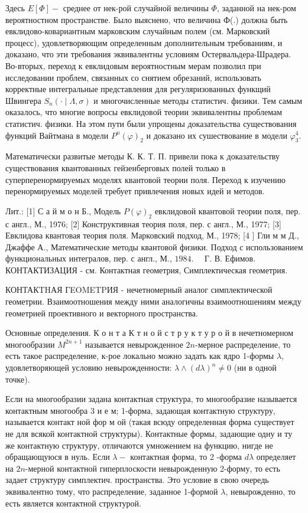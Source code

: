 \documentclass[10pt]{article}
\begin{document}
Здесь $E[\Phi]-$ среднее от нек-рой случайной величины $\Phi$, заданной на нек-ром вероятностном пространстве. Было выяснено, что величина Ф(.) должна быть евклидово-ковариантным марковским случайным полем (см. Марковский процесс), удовлетворяющим определенным дополнительным требованиям, и доказано, что эти требования эквивалентны условиям Остервальдера-Шрадера. Во-вторых, переход к евклидовым вероятностным мерам позволил при исследовании проблем, связанных со снятием обрезаний, использовать корректные интегральные представления для регуляризованных функщий Швингера $S_{n}(\cdot \mid \Lambda, \sigma)$ и многочисленные методы статистич. физики. Тем самым оказалось, что многие вопросы евклидовой теории эквивалентны проблемам статистич. физики. На этом пути были упрощены доказательства существования функций Вайтмана в модели $P^{n}(\varphi)_{2}$ и доказано их сушествование в модели $\varphi_{3}^{4}$.



Математически развитые методы К. К. Т. П. привели пока к доказательству существования квантованных гейзенберговых полей только в суперперенормируемых моделях квантовой теории поля. Переход к изучению перенормируемых моделей требует привлечения новых идей и методов.



Лит.: [1] С а й м о н Б., Модель $P(\varphi)_{2}$ евклидовой квантовой теории поля, пер. с англ., М., 1976; [2] Конструктивная теория поля, пер. с англ., М., 1977; [3] Евклидова квантовая теория поля. Марковский подход, М., 1978; [4 ] Гли м м Д., Джаффе А., Математические методы квантовой физики. Подход с использованием функциональных интегралов, пер. с англ., М., $1984 . \quad$ Г. В. Ефимов. КОНТАКТИЗАЦИЯ - см. Контактная геометрия, Симплектическая геометрия.



КОНТАКTHАЯ ГEOMETPИЯ - нечетномерный аналог симплектической геометрии. Взаимоотношения между ними аналогичны взаимоотношениям между геометрией проективного и векторного пространства.



Основные определения. К о н т а К т н о й с т р у к т у р о й в нечетномерном многообразии $M^{2 n+1}$ называется невырожденное $2 n$-мерное распределение, то есть такое распределение, к-рое локально можно задать как ядро 1-формы $\lambda$, удовлетворяющей условию невырожденности: $\lambda \wedge(d \lambda)^{n} \neq 0$ (ни в одной точке).



Если на многообразии задана контактная структура, то многообразие называется контактным многообра 3 и е м; 1-форма, задающая контактную структуру, называется контакт ной фор м ой (такая всюду определенная форма существует не для всякой контактной структуры). Контактные формы, задающие одну и ту же контактную структуру, отличаются умножением на функцию, нигде не обращающуюся в нуль. Если $\lambda-$ контактная форма, то 2 -форма $d \lambda$ определяет на $2 n$-мерной контактной гиперплоскости невырожденную 2-форму, то есть задает структуру симплектич. пространства. Это условие в свою очередь эквивалентно тому, что распределение, заданное 1-формой $\lambda$, невырожденно, то есть является контактной структурой.
\end{document}
